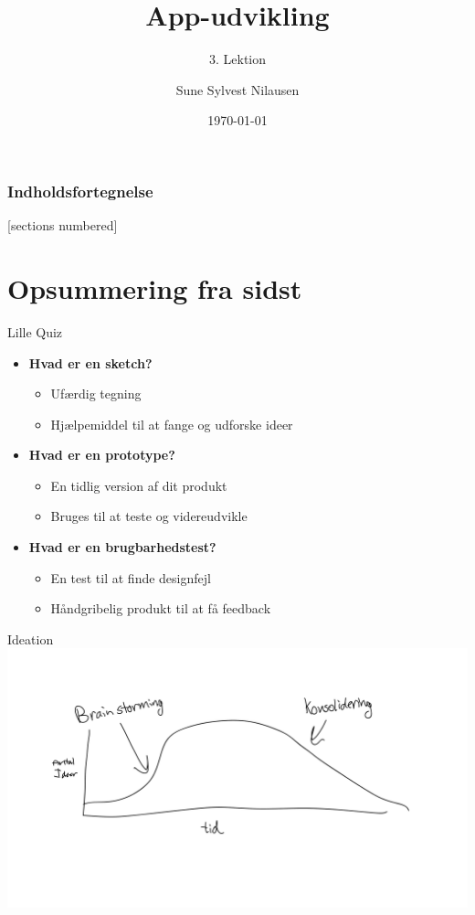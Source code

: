 \documentclass[10pt]{beamer}
\title{App-udvikling}
\subtitle{3. Lektion}
\date{\today}
\author{Sune Sylvest Nilausen}
\begin{document}

\maketitle

\begin{frame}
  \frametitle{Indholdsfortegnelse}
  [sections numbered]
  \tableofcontents[hideallsubsections]
\end{frame}

\section{Opsummering fra sidst}
\begin{frame}{Lille Quiz}
	\begin{itemize}
		\item \textbf{Hvad er en sketch?}
		\pause
		\begin{itemize}
			\item Ufærdig tegning
			\item Hjælpemiddel til at fange og udforske ideer
		\end{itemize}
		\item \textbf{Hvad er en prototype?}
		\pause
			\begin{itemize}
				\item En tidlig version af dit produkt
				\item Bruges til at teste og videreudvikle
			\end{itemize}
		\item \textbf{Hvad er en brugbarhedstest?}
		\pause
			\begin{itemize}
				\item En test til at finde designfejl
				\item Håndgribelig produkt til at få feedback
			\end{itemize}
	\end{itemize}

\end{frame}

\begin{frame}{Ideation}
		\includegraphics[scale=0.18]{img/ideation.pdf}
\end{frame}
\end{document}
